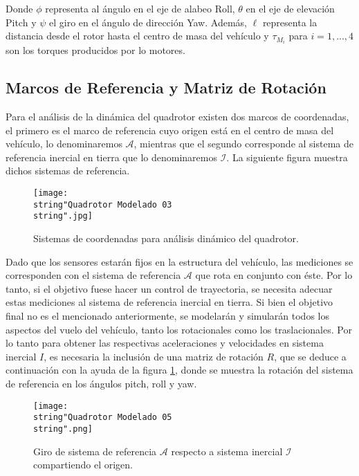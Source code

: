 \documentclass[\main/main.tex]{subfiles}
\begin{document}
Donde $\phi$ representa al ángulo en el eje de alabeo Roll, $\theta$ en el eje de elevación Pitch y $\psi$ el giro en el ángulo de dirección Yaw. Además, $\ell$ representa la distancia desde el rotor hasta el centro
de masa del vehículo y $\tau_{M_{i}}$ para $i=1,...,4$ son los torques
producidos por lo motores.

\subsection{Marcos de Referencia y Matriz de Rotación}

Para el análisis de la dinámica del quadrotor existen dos marcos de
coordenadas, el primero es el marco de referencia cuyo origen está
en el centro de masa del vehículo, lo denominaremos $\mathcal{A}$,
mientras que el segundo corresponde al sistema de referencia inercial
en tierra que lo denominaremos $\mathcal{I}$. La siguiente figura
muestra dichos sistemas de referencia. 

\noindent \begin{center}
\begin{figure}[H]
\noindent \begin{centering}
\texttt{[image: \\string"Quadrotor Modelado 03\\string".jpg]}
\par\end{centering}
\caption{Sistemas de coordenadas para análisis dinámico del quadrotor.}
\end{figure}
\par\end{center}

Dado que los sensores estarán fijos en la estructura del vehículo,
las mediciones se corresponden con el sistema de referencia $\mathcal{A}$
que rota en conjunto con éste. Por lo tanto, si el objetivo fuese
hacer un control de trayectoria, se necesita adecuar estas mediciones
al sistema de referencia inercial en tierra. Si bien el objetivo final
no es el mencionado anteriormente, se modelarán y simularán todos
los aspectos del vuelo del vehículo, tanto los rotacionales como los
traslacionales. Por lo tanto para obtener las respectivas aceleraciones
y velocidades en sistema inercial $I$, es necesaria la inclusión
de una matriz de rotación $R$, que se deduce a continuación con la
ayuda de la figura \ref{fig:Giro-de-sistema}, donde se muestra la
rotación del sistema de referencia en los ángulos pitch, roll y
yaw.

\begin{figure}[H]
\noindent \begin{centering}
\texttt{[image: \\string"Quadrotor Modelado 05\\string".png]}
\par\end{centering}
\caption{\label{fig:Giro-de-sistema}Giro de sistema de referencia $\mathcal{A}$
respecto a sistema inercial $\mathcal{I}$ compartiendo el origen.}
\end{figure}
\end{document}
